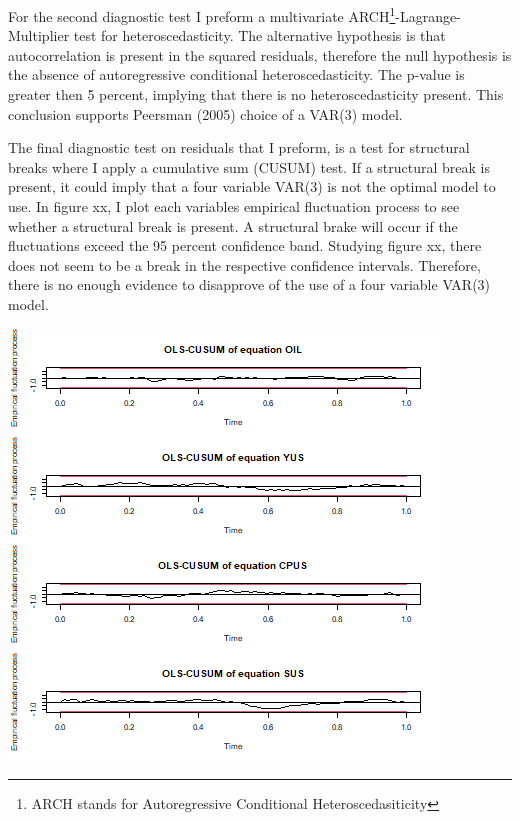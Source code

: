 \documentclass[11pt,preprint, authoryear]{elsarticle}
\let\origfigure\figure
\let\endorigfigure\endfigure
\renewenvironment{figure}[1][2] {
    \expandafter\origfigure\expandafter[H]
} {
    \endorigfigure
}
\numberwithin{equation}{section}
\numberwithin{figure}{section}
\numberwithin{table}{section}
\let\rmarkdownfootnote\footnote%
\def\footnote{\protect\rmarkdownfootnote}
\begin{document}
For the second diagnostic test I preform a multivariate
ARCH\footnote{ARCH stands for Autoregressive Conditional Heteroscedasiticity}-Lagrange-Multiplier
test for heteroscedasticity. The alternative hypothesis is that
autocorrelation is present in the squared residuals, therefore the null
hypothesis is the absence of autoregressive conditional
heteroscedasticity. The p-value is greater then 5 percent, implying that
there is no heteroscedasticity present. This conclusion supports
Peersman (2005) choice of a VAR(3) model.

The final diagnostic test on residuals that I preform, is a test for
structural breaks where I apply a cumulative sum (CUSUM) test. If a
structural break is present, it could imply that a four variable VAR(3)
is not the optimal model to use. In figure xx, I plot each variables
empirical fluctuation process to see whether a structural break is
present. A structural brake will occur if the fluctuations exceed the 95
percent confidence band. Studying figure xx, there does not seem to be a
break in the respective confidence intervals. Therefore, there is no
enough evidence to disapprove of the use of a four variable VAR(3)
model.

\begin{figure}[H]

{\centering \includegraphics{replication_files/figure-latex/Figure8-1} 

}

\caption{Test for Structural Break\label{Figure8}}\label{fig:Figure8}
\end{figure}
\end{document}
